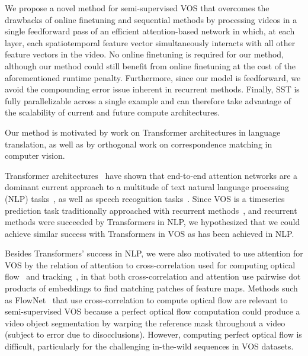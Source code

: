 We propose a novel method for semi-supervised VOS that overcomes the drawbacks
of online finetuning and sequential methods by processing videos in a single
feedforward pass of an efficient attention-based network in which, at each
layer, each spatiotemporal feature vector simultaneously interacts with all
other feature vectors in the video.
No online finetuning is required for our method, although our method could
still benefit from online finetuning at the cost of the aforementioned runtime
penalty.
Furthermore, since our model is feedforward, we avoid the compounding error
issue inherent in recurrent methods.
Finally, SST is fully parallelizable across a single example and can therefore
take advantage of the scalability of current and future compute architectures.

Our method is motivated by work on Transformer architectures in language
translation, as well as by orthogonal work on correspondence matching in
computer vision.

Transformer architectures~\citep{vaswani2017attention} have shown that
end-to-end attention networks are a dominant current approach to a multitude of
text natural language processing (NLP)
tasks~\citep{devlin2019bert, dai2019transformer}, as well as speech recognition
tasks~\citep{luscher2019rwth, kim2019improved}.
Since VOS is a timeseries prediction task traditionally approached with
recurrent methods~\citep{ventura2019rvos}, and recurrent methods were succeeded
by Transformers in NLP, we hypothesized that we could achieve similar success
with Transformers in VOS as has been achieved in NLP\@.

Besides Transformers' success in NLP, we were also motivated to use attention
for VOS by the relation of attention to cross-correlation used for computing
optical flow~\citep{dosovitskiy2015flownet} and tracking~\citep{li2018high}, in
that both cross-correlation and attention use pairwise dot products of
embeddings to find matching patches of feature maps.
Methods such as FlowNet~\citep{dosovitskiy2015flownet} that use
cross-correlation to compute optical flow are relevant to semi-supervised VOS
because a perfect optical flow computation could produce a video object
segmentation by warping the reference mask throughout a video (subject to error
due to disocclusions).
However, computing perfect optical flow is difficult, particularly for the
challenging in-the-wild sequences in VOS datasets.

